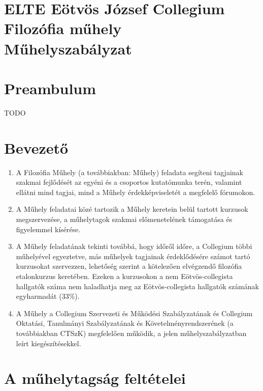 \documentclass{../styles/rulebook}
\begin{document}
\section*{ELTE Eötvös József Collegium \\ Filozófia műhely\\ \vspace{0.5em} Műhelyszabályzat} 

\vspace{2em}

\section*{Preambulum}
TODO


\section{Bevezető}

\begin{enumerate}
	\item A Filozófia Műhely (a továbbiakban: Műhely) feladata segíteni tagjainak szakmai
	fejlődését az egyéni és a csoportos kutatómunka terén, valamint ellátni mind tagjai,
	mind a Műhely érdekképviseletét a megfelelő fórumokon.
	\item A Műhely feladatai közé tartozik a Műhely keretein belül tartott kurzusok
	megszervezése, a műhelytagok szakmai előmenetelének támogatása és figyelemmel
	kísérése.
	\item A Műhely feladatának tekinti továbbá, hogy időről időre, a Collegium többi
	műhelyével egyeztetve, más műhelyek tagjainak érdeklődésére számot tartó
	kurzusokat szervezzen, lehetőség szerint a kötelezően elvégzendő filozófia
	etalonkurzus keretében. Ezeken a kurzusokon a nem Eötvös-collegista hallgatók
	száma nem haladhatja meg az Eötvös-collegista hallgatók számának egyharmadát (33\%).
	\item A Műhely a Collegium Szervezeti és Működési Szabályzatának és Collegium Oktatási, Tanulmányi Szabályzatának és Követelményrendszerének (a továbbiakban CTSzK) megfelelően működik, a jelen műhelyszabályzatban leírt kiegészítésekkel.
\end{enumerate}


\section{A műhelytagság feltételei}
\end{document}
